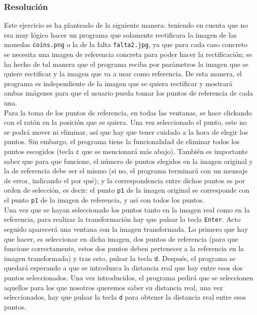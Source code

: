 \documentclass[a4paper,10pt,titlepage,oneside,openright]{book}
\begin{document}
\subsubsection*{Resolución}
Este ejercicio se ha planteado de la siguiente manera: teniendo en cuenta que no era muy lógico hacer un programa que solamente rectificara la imagen de las monedas \texttt{coins.png} o la de la falta \texttt{falta2.jpg}, ya que para cada caso concreto se necesita una imagen de referencia concreta para poder hacer la rectificación; se ha hecho de tal manera que el programa reciba por parámetros la imagen que se quiere rectificar y la imagen que va a usar como referencia. De esta manera, el programa es independiente de la imagen que se quiera rectificar y mostrará ambas imágenes para que el usuario pueda tomar los puntos de referencia de cada una. \\

Para la toma de los puntos de referencia, en todas las ventanas, se hace clickando con el ratón en la posición que se quiera. Una vez seleccionado el punto, este no se podrá mover ni eliminar, así que hay que tener cuidado a la hora de elegir los puntos. Sin embargo, el programa tiene la funcionalidad de eliminar todos los puntos escogidos (tecla \texttt{c} que se mencionará más abajo). También es importante saber que para que funcione, el número de puntos elegidos en la imagen original y la de referencia debe ser el mismo (si no, el programa terminará con un mensaje de error, indicando el por qué); y la correspondencia entre dichos puntos es por orden de selección, es decir: el punto \texttt{p1} de la imagen original se corresponde con el punto \texttt{p1} de la imagen de referencia, y así con todos los puntos. \\

Una vez que se hayan seleccionado los puntos tanto en la imagen real como en la referencia, para realizar la transformación hay que pulsar la tecla \texttt{Enter}. Acto seguido aparecerá una ventana con la imagen transformada. Lo primero que hay que hacer, es seleccionar en dicha imagen, dos puntos de referencia (para que funcione correctamente, estos dos puntos deben pertenecer a la referencia en la imagen transformada) y tras esto, pulsar la tecla \texttt{d}. Después, el programa se quedará esperando a que se introduzca la distancia real que hay entre esos dos puntos seleccionados. Una vez introducidos, el programa pedirá que se seleccionen aquellos para los que nosotros queremos saber su distancia real, una vez seleccionados, hay que pulsar la tecla \texttt{d} para obtener la distancia real entre esos puntos. \\
\end{document}
